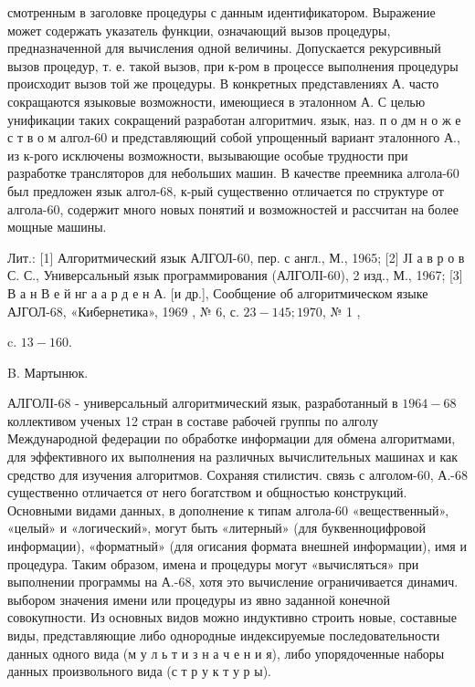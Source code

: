 \documentclass[10pt]{article}
\begin{document}
смотренным в заголовке процедуры с данным идентификатором. Выражение может содержать указатель функции, означающий вызов процедуры, предназначенной для вычисления одной величины. Допускается рекурсивный вызов процедур, т. е. такой вызов, при к-ром в процессе выполнения процедуры происходит вызов той же процедуры. В конкретных представлениях А. часто сокращаются языковые возможности, имеющиеся в эталонном А. С целью унификации таких сокращений разработан алгоритмич. язык, наз. п о дм н о ж е с т в о м алгол-60 и представляющий собой упрощенный вариант эталонного А., из к-рого исключены возможности, вызывающие особые трудности при разработке трансляторов для небольших машин. В качестве преемника алгола-60 был предложен язык алгол-68, к-рый существенно отличается по структуре от алгола-60, содержит много новых понятий и возможностей и рассчитан на более мощные машины.



Лит.: [1] Алгоритмический язык АЛГОЛ-60, пер. с англ., М., 1965; [2] ЈI а в р о в С. С., Универсальный язык программирования (АЛГОЛІ-60), 2 изд., М., 1967; [3] В а н В е й нг а а р д е н А. [и др.], Сообщение об алгоритмическом языке АЈГОЛ-68, «Кибернетика», 1969 , № 6, с. $23-145 ; 1970$, № 1 ,

c. $13-160$.

B. Мартынюк.



АЛГОЛІ-68 - универсальный алгоритмический язык, разработанный в $1964-68$ коллективом ученых 12 стран в составе рабочей группы по алголу Международной федерации по обработке информации для обмена алгоритмами, для эффективного их выполнения на различных вычислительных машинах и как средство для изучения алгоритмов. Сохраняя стилистич. связь с алголом-60, А.-68 существенно отличается от него богатством и общностью конструкций. Основными видами данных, в дополнение к типам алгола-60 «вещественный», «целый» и «логический», могут быть «литерный» (для буквенноцифровой информации), «форматный» (для огисания формата внешней информации), имя и процедура. Таким образом, имена и процедуры могут «вычисляться» при выполнении программы на А.-68, хотя это вычисление ограничивается динамич. выбором значения имени или процедуры из явно заданной конечной совокупности. Из основных видов можно индуктивно строить новые, составные виды, представляющие либо однородные индексируемые последовательности данных одного вида (м у л ь т и з н а ч е н и я), либо упорядоченные наборы данных произвольного вида (с т р у к т у р ы).
\end{document}
